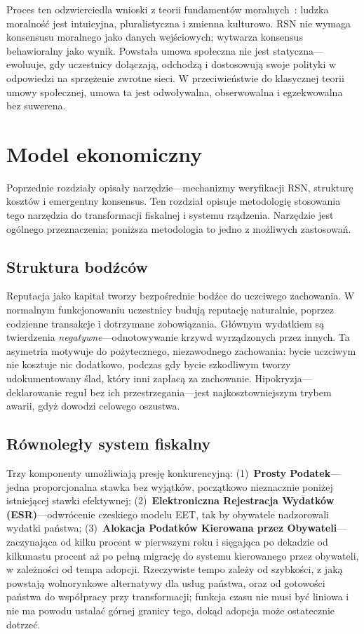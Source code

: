 \documentclass[11pt,a4paper,twocolumn]{article}
\begin{document}
Proces ten odzwierciedla wnioski z teorii fundamentów moralnych~\cite{haidt2012}: ludzka moralność jest intuicyjna, pluralistyczna i zmienna kulturowo. RSN nie wymaga konsensusu moralnego jako danych wejściowych; wytwarza konsensus behawioralny jako wynik. Powstała umowa społeczna nie jest statyczna---ewoluuje, gdy uczestnicy dołączają, odchodzą i dostosowują swoje polityki w odpowiedzi na sprzężenie zwrotne sieci. W przeciwieństwie do klasycznej teorii umowy społecznej, umowa ta jest odwoływalna, obserwowalna i egzekwowalna bez suwerena.

\section{Model ekonomiczny}

Poprzednie rozdziały opisały narzędzie---mechanizmy weryfikacji RSN, strukturę kosztów i emergentny konsensus. Ten rozdział opisuje metodologię stosowania tego narzędzia do transformacji fiskalnej i systemu rządzenia. Narzędzie jest ogólnego przeznaczenia; poniższa metodologia to jedno z możliwych zastosowań.

\subsection{Struktura bodźców}

Reputacja jako kapitał tworzy bezpośrednie bodźce do uczciwego zachowania. W normalnym funkcjonowaniu uczestnicy budują reputację naturalnie, poprzez codzienne transakcje i dotrzymane zobowiązania. Głównym wydatkiem są twierdzenia \emph{negatywne}---odnotowywanie krzywd wyrządzonych przez innych. Ta asymetria motywuje do pożytecznego, niezawodnego zachowania: bycie uczciwym nie kosztuje nic dodatkowo, podczas gdy bycie szkodliwym tworzy udokumentowany ślad, który inni zapłacą za zachowanie. Hipokryzja---deklarowanie reguł bez ich przestrzegania---jest najkosztowniejszym trybem awarii, gdyż dowodzi celowego oszustwa.

\subsection{Równoległy system fiskalny}

Trzy komponenty umożliwiają presję konkurencyjną: (1)~\textbf{Prosty Podatek}---jedna proporcjonalna stawka bez wyjątków, początkowo nieznacznie poniżej istniejącej stawki efektywnej; (2)~\textbf{Elektroniczna Rejestracja Wydatków (ESR)}---odwrócenie czeskiego modelu EET, tak by obywatele nadzorowali wydatki państwa; (3)~\textbf{Alokacja Podatków Kierowana przez Obywateli}---zaczynająca od kilku procent w pierwszym roku i sięgająca po dekadzie od kilkunastu procent aż po pełną migrację do systemu kierowanego przez obywateli, w zależności od tempa adopcji. Rzeczywiste tempo zależy od szybkości, z jaką powstają wolnorynkowe alternatywy dla usług państwa, oraz od gotowości państwa do współpracy przy transformacji; funkcja czasu nie musi być liniowa i nie ma powodu ustalać górnej granicy tego, dokąd adopcja może ostatecznie dotrzeć.
\end{document}
